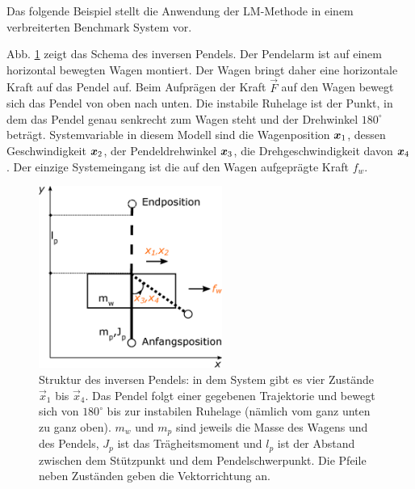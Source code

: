 Das folgende Beispiel stellt die Anwendung der LM-Methode in einem verbreiterten Benchmark System vor.

\begin{beispiel}
	Abb. \ref{fig:Inverses-Pendel} zeigt das Schema des inversen Pendels. Der Pendelarm ist auf einem horizontal bewegten Wagen montiert. Der Wagen bringt daher eine horizontale Kraft auf das Pendel auf. Beim Aufprägen der Kraft $\vec{F}$ auf den Wagen bewegt sich das Pendel von oben nach unten. Die instabile Ruhelage ist der Punkt, in dem das Pendel genau senkrecht zum Wagen steht und der Drehwinkel $180^{\circ}$ beträgt. Systemvariable in diesem Modell sind die Wagenposition $\boldsymbol x_{1}$, dessen Geschwindigkeit $\boldsymbol x_{2}$, der Pendeldrehwinkel $\boldsymbol x_{3}$, die Drehgeschwindigkeit davon $\boldsymbol x_{4}$. Der einzige Systemeingang ist die auf den Wagen aufgeprägte Kraft $f_{w}$.
	\begin{figure}
		\centering
		\includegraphics[width=6cm]{bild/modul/Inverses-Pendel.eps}
		\caption{Struktur des inversen Pendels: in dem System gibt es vier Zustände $\vec{x}_{1}$ bis $\vec{x}_{4}$. Das Pendel folgt einer gegebenen Trajektorie und bewegt sich von $180^{\circ}$ bis zur instabilen Ruhelage (nämlich vom ganz unten zu ganz oben). $m_{w}$ und $m_{p}$ sind jeweils die Masse des Wagens und des Pendels, $J_{p}$ ist das Trägheitsmoment und $l_{p}$ ist der Abstand zwischen dem Stützpunkt und dem Pendelschwerpunkt. Die Pfeile neben Zuständen geben die Vektorrichtung an.}
		\label{fig:Inverses-Pendel}
	\end{figure}  


\end{beispiel}
